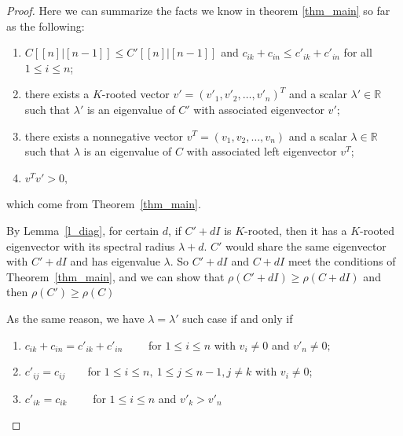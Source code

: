 \documentclass[12pt, a4paper]{article}
\theoremstyle{plain}
\theoremstyle{definition}
\begin{document}
\begin{proof}
    Here we can summarize the facts we know in theorem \ref{thm_main} so far as the following:
    \begin{enumerate}[label=(\roman*)]
        \item  $C[[n]|[n-1]]\leq C'[[n]|[n-1]]$ and $c_{ik}+c_{in}\leq c'_{ik}+c'_{in}$ for all $1\leq i\leq n$;
        \item  there exists a $K$-rooted vector $v'=(v'_1, v'_2, \ldots, v'_n)^T$ and a scalar $\lambda'\in \mathbb{R}$
        such that $\lambda'$ is an eigenvalue of $C'$ with associated eigenvector $v'$;
        \item there exists a nonnegative vector $v^T=(v_1, v_2, \ldots, v_n)$ and a scalar $\lambda\in \mathbb{R}$
         such that $\lambda$ is an eigenvalue of $C$ with associated left eigenvector $v^T$;
        \item $v^Tv'>0,$
    \end{enumerate}
    which come from Theorem~\ref{thm_main}.

    By Lemma~\ref{l_diag}, for certain $d$, if $C'+dI$ is $K$-rooted, then it has
    a $K$-rooted eigenvector with its spectral radius $\lambda + d$. $C'$ would share the same
    eigenvector with $C'+dI$ and has eigenvalue $\lambda$. So $C'+dI$ and $C+dI$ meet the
    conditions of Theorem~\ref{thm_main}, and we can show that $\rho(C' + dI) \geq \rho(C +dI)$ and
    then $\rho(C') \geq \rho(C)$ 

    As the same reason, we have $\lambda=\lambda'$ such case
    if and only if
    \begin{enumerate}[label=(\alph*)]
        \item \label{thm_main:equ_cond_a} $c_{ik}+c_{in}=c'_{ik}+c'_{in} \qquad$  for $1\leq i\leq n$ with $v_i\not=0$
         and $v'_n\not=0;$
        \item \label{thm_main:equ_cond_b} $c'_{ij}=c_{ij}\qquad $for $1\leq i\leq n,~1\leq j\leq n-1, j \neq k $
         with $v_i\ne 0 $;
        \item \label{thm_main:equ_cond_c} $c'_{ik}=c_{ik} \qquad $  for $1\leq i \leq n$ and $ v'_{k}>v'_n$
    \end{enumerate} %


\end{proof}
\end{document}
